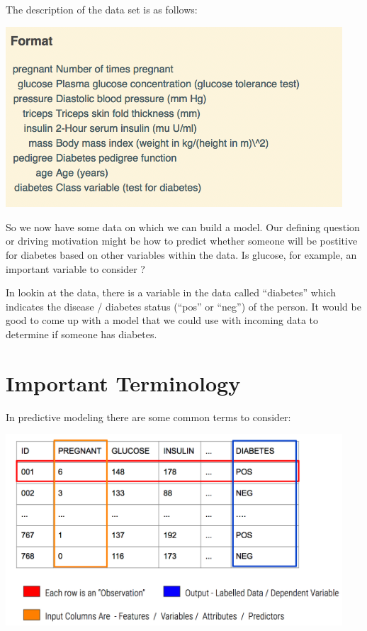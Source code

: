 \documentclass[
]{book}
\begin{document}
The description of the data set is as follows:

\includegraphics[width=4.94792in,height=\textheight]{./PICS/pima_desc.png}

So we now have some data on which we can build a model. Our defining question or driving motivation might be how to predict whether someone will be postitive for diabetes based on other variables within the data. Is glucose, for example, an important variable to consider ?

In lookin at the data, there is a variable in the data called ``diabetes'' which indicates the disease / diabetes status (``pos'' or ``neg'') of the person. It would be good to come up with a model that we could use with incoming data to determine if someone has diabetes.

\hypertarget{important-terminology}{%
\section{Important Terminology}\label{important-terminology}}

In predictive modeling there are some common terms to consider:

\includegraphics[width=4.94792in,height=\textheight]{./PICS/features2.png}
\end{document}
